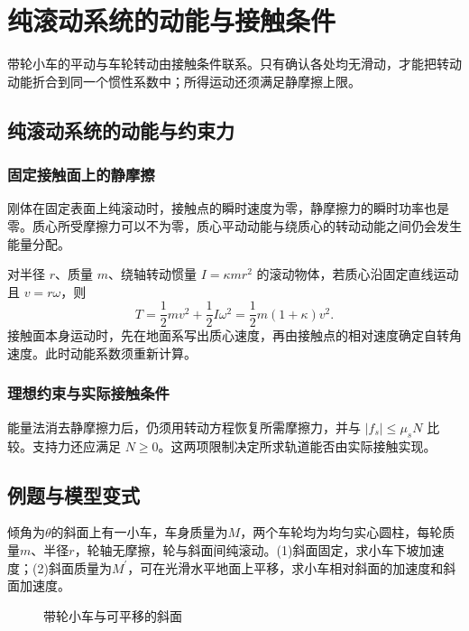 \section{纯滚动系统的动能与接触条件}

带轮小车的平动与车轮转动由接触条件联系。只有确认各处均无滑动，才能把转动动能折合到同一个惯性系数中；所得运动还须满足静摩擦上限。



\subsection{纯滚动系统的动能与约束力}
\subsubsection{固定接触面上的静摩擦}
刚体在固定表面上纯滚动时，接触点的瞬时速度为零，静摩擦力的瞬时功率也是零。质心所受摩擦力可以不为零，质心平动动能与绕质心的转动动能之间仍会发生能量分配。

对半径 $r$、质量 $m$、绕轴转动惯量 $I=\kappa mr^2$ 的滚动物体，若质心沿固定直线运动且 $v=r\omega$，则
\[
T=\frac12mv^2+\frac12I\omega^2
=\frac12m(1+\kappa)v^2.
\]
接触面本身运动时，先在地面系写出质心速度，再由接触点的相对速度确定自转角速度。此时动能系数须重新计算。

\subsubsection{理想约束与实际接触条件}
能量法消去静摩擦力后，仍须用转动方程恢复所需摩擦力，并与 $|f_s|\le\mu_sN$ 比较。支持力还应满足 $N\ge0$。这两项限制决定所求轨道能否由实际接触实现。


\subsection{例题与模型变式}

\begin{example}[固定斜面与可动斜面上的带轮小车]\label{ex:hw1-5}

倾角为$\theta$的斜面上有一小车，车身质量为$M$，两个车轮均为均匀实心圆柱，每轮质量$m$、半径$r$，轮轴无摩擦，轮与斜面间纯滚动。(1)斜面固定，求小车下坡加速度；(2)斜面质量为$M^\prime$，可在光滑水平地面上平移，求小车相对斜面的加速度和斜面加速度。

\end{example}


\begin{figure}[H]\centering
{}
\caption{带轮小车与可平移的斜面}\label{fig:hw1-5-q}
\end{figure}

